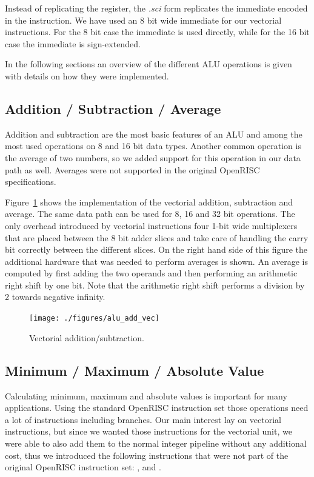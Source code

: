 Instead of replicating the register, the \textit{.sci} form replicates the
immediate encoded in the instruction. We have used an 8 bit wide immediate for
our vectorial instructions. For the 8 bit case the immediate is used directly,
while for the 16 bit case the immediate is sign-extended.

In the following sections an overview of the different \gls{ALU} operations is
given with details on how they were implemented.


\subsection{Addition / Subtraction / Average}

Addition and subtraction are the most basic features of an \gls{ALU} and among
the most used operations on 8 and 16 bit data types. Another common operation is
the average of two numbers, so we added support for this operation in our data
path as well. Averages were not supported in the original OpenRISC
specifications.

Figure~\ref{fig:alu_add_vec} shows the implementation of the vectorial addition,
subtraction and average. The same data path can be used for 8, 16 and 32 bit
operations. The only overhead introduced by vectorial instructions four 1-bit
wide multiplexers that are placed between the 8 bit adder slices and take care
of handling the carry bit correctly between the different slices.  On the right
hand side of this figure the additional hardware that was needed to perform
averages is shown. An average is computed by first adding the two operands and
then performing an arithmetic right shift by one bit. Note that the arithmetic
right shift performs a division by 2 towards negative infinity.

\begin{figure}[htbp]
  \centering
  \texttt{[image: ./figures/alu\_add\_vec]}
  \caption{Vectorial addition/subtraction.}
  \label{fig:alu_add_vec}
\end{figure}


\subsection{Minimum / Maximum / Absolute Value}

Calculating minimum, maximum and absolute values is important for many
applications. Using the standard OpenRISC instruction set those operations need
a lot of instructions including branches. 
Our main interest lay on vectorial instructions, but since we wanted those
instructions for the vectorial unit, we were able to also add them to the normal
integer pipeline without any additional cost, thus we introduced the following
instructions that were not part of the original OpenRISC instruction set:
,  and .

